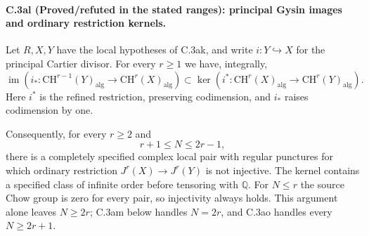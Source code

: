 \paragraph{C.3al (Proved/refuted in the stated ranges): principal Gysin images and ordinary restriction kernels.}
Let $R,X,Y$ have the local hypotheses of C.3ak, and
write $i:Y\hookrightarrow X$ for the principal Cartier
divisor. For every $r\ge1$ we have, integrally,
\[
 \operatorname{im}\!\left(
 i_*:\mathrm{CH}^{r-1}(Y)_{\mathrm{alg}}
              \longrightarrow\mathrm{CH}^r(X)_{\mathrm{alg}}
              \right)
 \subset
 \ker\!\left(
 i^*:\mathrm{CH}^r(X)_{\mathrm{alg}}
              \longrightarrow\mathrm{CH}^r(Y)_{\mathrm{alg}}
              \right).
\]
Here $i^*$ is the refined restriction, preserving
codimension, and $i_*$ raises codimension by one.

Consequently, for every $r\ge2$ and
\[
                         r+1\le N\le2r-1,
\]
there is a completely specified complex local pair with
regular punctures for which ordinary restriction
$J^r(X)\to J^r(Y)$ is not injective. The kernel contains
a specified class of infinite order before tensoring
with $\mathbb Q$. For $N\le r$ the source Chow group is
zero for every pair, so injectivity always holds.
This argument alone leaves $N\ge2r$; C.3am below
handles $N=2r$, and C.3ao handles every $N\ge2r+1$.

